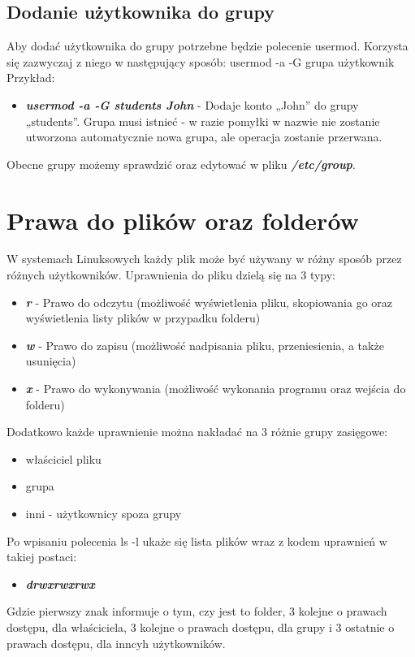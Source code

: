 \documentclass{article}
\begin{document}
\newpage
\subsection{Dodanie użytkownika do grupy}

Aby dodać użytkownika do grupy potrzebne będzie polecenie usermod. Korzysta się
zazwyczaj z niego w następujący sposób:
usermod -a -G grupa użytkownik
Przykład:
\begin{itemize}
    \item \emph{\textbf{usermod -a -G students John}} - Dodaje konto „John” do grupy „students”. Grupa
    musi istnieć - w razie pomyłki w nazwie nie zostanie utworzona automatycznie nowa
    grupa, ale operacja zostanie przerwana.
\end{itemize}
Obecne grupy możemy sprawdzić oraz edytować w pliku \emph{\textbf{/etc/group}}.




\section{Prawa do plików oraz folderów}

W systemach Linuksowych każdy plik może być używany w różny sposób
przez różnych użytkowników. Uprawnienia do pliku dzielą się na 3 typy:
\begin{itemize}
\item   \emph{\textbf{r}} - Prawo do odczytu (możliwość wyświetlenia pliku, skopiowania go oraz wyświetlenia listy plików w przypadku folderu)
\item   \emph{\textbf{w}} - Prawo do zapisu (możliwość nadpisania pliku, przeniesienia, a także usunięcia)
\item   \emph{\textbf{x}} - Prawo do wykonywania (możliwość wykonania programu oraz wejścia do folderu)
\end{itemize}

Dodatkowo każde uprawnienie można nakładać na 3 różnie grupy zasięgowe:
\begin{itemize}
    \item właściciel pliku
    \item grupa
    \item inni - użytkownicy spoza grupy
\end{itemize}


Po wpisaniu polecenia ls -l ukaże się lista plików wraz z kodem uprawnień w takiej
postaci:
\begin{itemize}
    \item \emph{\textbf{drwxrwxrwx}}
\end{itemize}
Gdzie pierwszy znak informuje o tym, czy jest to folder, 3 kolejne o prawach dostępu, 
dla właściciela, 3 kolejne o prawach dostępu, dla grupy i 3 ostatnie o prawach dostępu, dla inncyh użytkowników.
\end{document}
